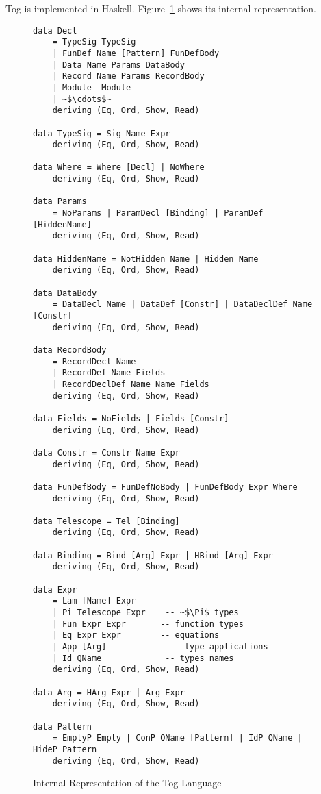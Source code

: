 Tog is implemented in Haskell. Figure~\ref{fig:togRepr} shows its internal representation. 
\begin{figure}
\begin{verbatim}
data Decl
    = TypeSig TypeSig
    | FunDef Name [Pattern] FunDefBody
    | Data Name Params DataBody
    | Record Name Params RecordBody
    | Module_ Module
    | ~$\cdots$~
    deriving (Eq, Ord, Show, Read)

data TypeSig = Sig Name Expr
    deriving (Eq, Ord, Show, Read)

data Where = Where [Decl] | NoWhere
    deriving (Eq, Ord, Show, Read)

data Params
    = NoParams | ParamDecl [Binding] | ParamDef [HiddenName]
    deriving (Eq, Ord, Show, Read)

data HiddenName = NotHidden Name | Hidden Name
    deriving (Eq, Ord, Show, Read)

data DataBody
    = DataDecl Name | DataDef [Constr] | DataDeclDef Name [Constr]
    deriving (Eq, Ord, Show, Read)

data RecordBody
    = RecordDecl Name
    | RecordDef Name Fields
    | RecordDeclDef Name Name Fields
    deriving (Eq, Ord, Show, Read)

data Fields = NoFields | Fields [Constr]
    deriving (Eq, Ord, Show, Read)

data Constr = Constr Name Expr
    deriving (Eq, Ord, Show, Read)

data FunDefBody = FunDefNoBody | FunDefBody Expr Where
    deriving (Eq, Ord, Show, Read)

data Telescope = Tel [Binding]
    deriving (Eq, Ord, Show, Read)

data Binding = Bind [Arg] Expr | HBind [Arg] Expr
    deriving (Eq, Ord, Show, Read)

data Expr
    = Lam [Name] Expr
    | Pi Telescope Expr    -- ~$\Pi$ types 
    | Fun Expr Expr       -- function types  
    | Eq Expr Expr        -- equations 
    | App [Arg]             -- type applications 
    | Id QName             -- types names
    deriving (Eq, Ord, Show, Read)

data Arg = HArg Expr | Arg Expr
    deriving (Eq, Ord, Show, Read)

data Pattern
    = EmptyP Empty | ConP QName [Pattern] | IdP QName | HideP Pattern
    deriving (Eq, Ord, Show, Read)
\end{verbatim}
\caption{Internal Representation of the Tog Language}
\label{fig:togRepr}
\end{figure}

